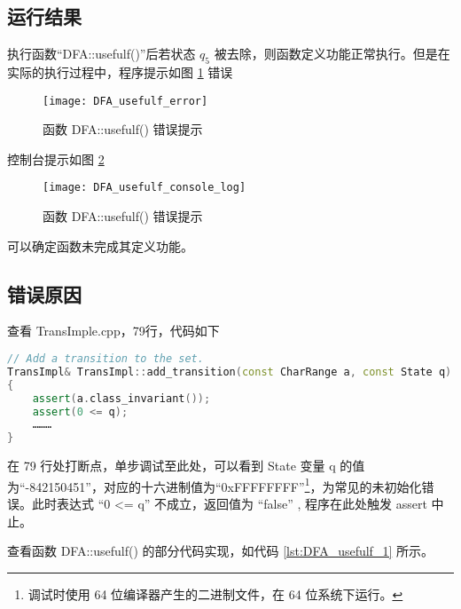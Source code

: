 \subsection{运行结果}

执行函数“DFA::usefulf()”后若状态 $q_5$ 被去除，则函数定义功能正常执行。但是在实际的执行过程中，程序提示如图 \ref{fig::usefulf_error} 错误 

\begin{figure}[!htbp]
    \centering
    \texttt{[image: DFA\_usefulf\_error]}
    \caption{函数 DFA::usefulf() 错误提示}
    \label{fig::usefulf_error}
\end{figure}
控制台提示如图 \ref{fig::usefulf_console_log}
\begin{figure}[!htbp]
    \centering
    \texttt{[image: DFA\_usefulf\_console\_log]}
    \caption{函数 DFA::usefulf() 错误提示}
    \label{fig::usefulf_console_log}
\end{figure}

可以确定函数未完成其定义功能。

\subsection{错误原因}

查看 TransImple.cpp，79行，代码如下

\begin{lstlisting}[language=C++,label={lst:TransImple},caption={ TransImple.cpp },firstnumber=75]
// Add a transition to the set.
TransImpl& TransImpl::add_transition(const CharRange a, const State q)
{
    assert(a.class_invariant());
    assert(0 <= q);
    ………
}
\end{lstlisting}

在 79 行处打断点，单步调试至此处，可以看到 State 变量 q 的值为“-842150451”，对应的十六进制值为“0xFFFFFFFF”\footnote{调试时使用 64 位编译器产生的二进制文件，在 64 位系统下运行。}，为常见的未初始化错误。此时表达式 “0 <= q” 不成立，返回值为 “false” , 程序在此处触发 assert 中止。

查看函数 DFA::usefulf() 的部分代码实现，如代码 \ref{lst:DFA_usefulf_1} 所示。

